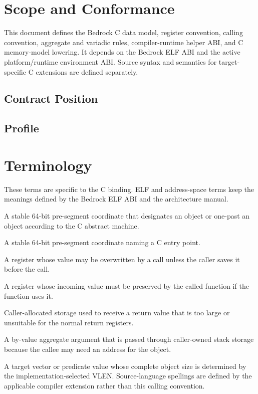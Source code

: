 \documentclass[10pt,twoside]{article}
\begin{document}
\BedrockFrontMatter

\clearpage
\section{Scope and Conformance}\label{page:scope-and-conformance}
This document defines the Bedrock C data model, register convention, calling
convention, aggregate and variadic rules, compiler-runtime helper ABI, and C
memory-model lowering. It depends on the
Bedrock ELF ABI and the active platform/runtime environment ABI. Source syntax
and semantics for target-specific C extensions are defined separately.

\subsection{Contract Position}

\subsection{Profile}

\clearpage
\section{Terminology}\label{page:terminology}
These terms are specific to the C binding. ELF and address-space terms keep the meanings defined by the Bedrock ELF ABI and the architecture manual.
\begin{description}[style=nextline,leftmargin=1.45in,labelwidth=1.35in,itemsep=3pt,topsep=3pt]
\item[object pointer] A stable 64-bit pre-segment coordinate that designates an object or one-past an object according to the C abstract machine.
\item[function pointer] A stable 64-bit pre-segment coordinate naming a C entry point.
\item[caller-saved register] A register whose value may be overwritten by a call unless the caller saves it before the call.
\item[callee-saved register] A register whose incoming value must be preserved by the called function if the function uses it.
\item[sret buffer] Caller-allocated storage used to receive a return value that is too large or unsuitable for the normal return registers.
\item[addressable by-value argument] A by-value aggregate argument that is passed through caller-owned stack storage because the callee may need an address for the object.
\item[scalable value] A target vector or predicate value whose complete object
size is determined by the implementation-selected VLEN. Source-language
spellings are defined by the applicable compiler extension rather than this
calling convention.
\end{description}
\end{document}

